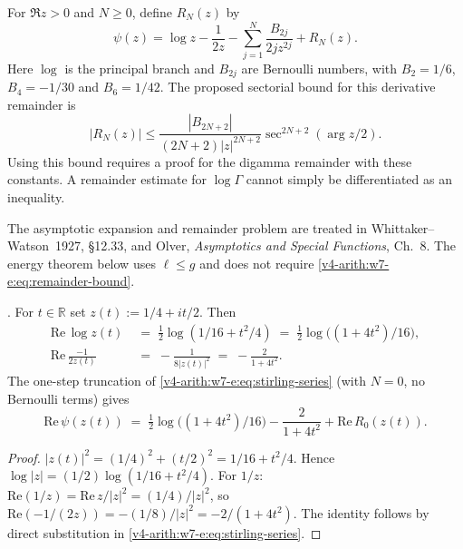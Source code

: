 \begin{definition}
\label{v4-arith:w7-e:lem:stirling-series}
For $\Re z>0$ and $N\ge0$, define $R_N(z)$ by
\begin{equation}
\label{v4-arith:w7-e:eq:stirling-series}
 \psi(z)=\log z-\frac1{2z}
 -\sum_{j=1}^N\frac{B_{2j}}{2jz^{2j}}+R_N(z).
\end{equation}
Here $\log$ is the principal branch and $B_{2j}$ are Bernoulli numbers,
with $B_2=1/6$, $B_4=-1/30$ and $B_6=1/42$.
The proposed sectorial bound for this derivative remainder is
\begin{equation}
\label{v4-arith:w7-e:eq:remainder-bound}
 |R_N(z)|\le
 \frac{|B_{2N+2}|}{(2N+2)|z|^{2N+2}}
 \sec^{2N+2}(\arg z/2).
\end{equation}
Using this bound requires a proof for the digamma remainder with
these constants. A remainder estimate for $\log\Gamma$ cannot
simply be differentiated as an inequality.
\end{definition}
The asymptotic expansion and remainder problem are treated in
Whittaker--Watson~1927, \S12.33, and Olver,
\emph{Asymptotics and Special Functions}, Ch.~8.
The energy theorem below uses $\ell\le g$ and does not require
\eqref{v4-arith:w7-e:eq:remainder-bound}.

\begin{lemma}[real-part Stirling at \(z=1/4+it/2\)]
\label{v4-arith:w7-e:lem:re-psi}
\ClaimStatusProvedHere. For \(t\in\mathbb{R}\) set
\(z(t):=1/4+it/2\). Then
\begin{align}
\label{v4-arith:w7-e:eq:re-log-z}
\mathrm{Re}\,\log z(t)&\;=\;\tfrac{1}{2}\log(1/16+t^{2}/4)\;=\;\tfrac{1}{2}\log\bigl((1+4t^{2})/16\bigr),\\
\label{v4-arith:w7-e:eq:re-reciprocal-z}
\mathrm{Re}\,\frac{-1}{2z(t)}&\;=\;-\frac{1}{8|z(t)|^{2}}\;=\;-\frac{2}{1+4t^{2}}.
\end{align}
The one-step truncation of \eqref{v4-arith:w7-e:eq:stirling-series}
(with \(N=0\), no Bernoulli terms) gives
\begin{equation}
\label{v4-arith:w7-e:eq:stirling-1}
\mathrm{Re}\,\psi(z(t))\;=\;\tfrac{1}{2}\log\bigl((1+4t^{2})/16\bigr)-\frac{2}{1+4t^{2}}+\mathrm{Re}\,R_{0}(z(t)).
\end{equation}
\end{lemma}

\begin{proof}
\(|z(t)|^{2}=(1/4)^{2}+(t/2)^{2}=1/16+t^{2}/4\). Hence \(\log|z|=
(1/2)\log(1/16+t^{2}/4)\). For \(1/z\): \(\mathrm{Re}(1/z)=\mathrm{Re}\,z/|z|^{2}=(1/4)/|z|^{2}\),
so \(\mathrm{Re}(-1/(2z))=-(1/8)/|z|^{2}=-2/(1+4t^{2})\). The identity
follows by direct substitution in \eqref{v4-arith:w7-e:eq:stirling-series}.
\end{proof}

